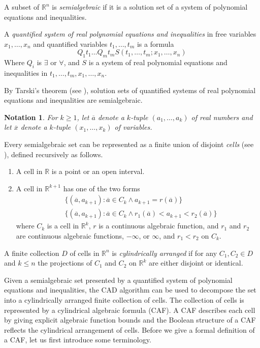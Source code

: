 \documentclass[english]{amsart}
\numberwithin{equation}{section}
\numberwithin{figure}{section}
\newtheorem{notation}[thm]{Notation}
\begin{document}
A subset of $\mathbb{R}^{n}$ is \emph{semialgebraic} if it is a solution
set of a system of polynomial equations and inequalities. 

A \emph{quantified system of real polynomial equations and inequalities}
in free variables $x_{1},\ldots,x_{n}$ and quantified variables $t_{1},\ldots,t_{m}$
is a formula \[
Q_{1}t_{1}\ldots Q_{m}t_{m}S(t_{1},\ldots,t_{m};x_{1},\ldots,x_{n})\]
 Where $Q_{i}$ is $\exists$ or $\forall$, and $S$ is a system
of real polynomial equations and inequalities in $t_{1},\ldots,t_{m},x_{1},\ldots,x_{n}$.

By Tarski's theorem (see \cite{T}), solution sets of quantified systems
of real polynomial equations and inequalities are semialgebraic.
\begin{notation}
For $k\geq1$, let $\overline{a}$ denote a $k$-tuple $(a_{1},\ldots,a_{k})$
of real numbers and let $\overline{x}$ denote a $k$-tuple $(x_{1},\ldots,x_{k})$
of variables.
\end{notation}
Every semialgebraic set can be represented as a finite union of disjoint
\emph{cells} (see \cite{L}), defined recursively as follows.
\begin{enumerate}
\item A cell in $\mathbb{R}$ is a point or an open interval.
\item A cell in $\mathbb{R}^{k+1}$ has one of the two forms\begin{eqnarray*}
 & \{(\overline{a},a_{k+1}):\overline{a}\in C_{k}\wedge a_{k+1}=r(\overline{a})\}\\
 & \{(\overline{a},a_{k+1}):\overline{a}\in C_{k}\wedge r_{1}(\overline{a})<a_{k+1}<r_{2}(\overline{a})\}\end{eqnarray*}
where $C_{k}$ is a cell in $\mathbb{R}^{k}$, $r$ is a continuous
algebraic function, and $r_{1}$ and $r_{2}$ are continuous algebraic
functions, $-\infty$, or $\infty$, and $r_{1}<r_{2}$ on $C_{k}$. 
\end{enumerate}
A finite collection $D$ of cells in $\mathbb{R}^{n}$ is \emph{cylindrically
arranged} if for any $C_{1},C_{2}\in D$ and $k\leq n$ the projections
of $C_{1}$ and $C_{2}$ on $\mathbb{R}^{k}$ are either disjoint
or identical. 

Given a semialgebraic set presented by a quantified system of polynomial
equations and inequalities, the CAD algorithm can be used to decompose
the set into a cylindrically arranged finite collection of cells.
The collection of cells is represented by a cylindrical algebraic
formula (CAF). A CAF describes each cell by giving explicit algebraic
function bounds and the Boolean structure of a CAF reflects the cylindrical
arrangement of cells. Before we give a formal definition of a CAF,
let us first introduce some terminology.
\end{document}
